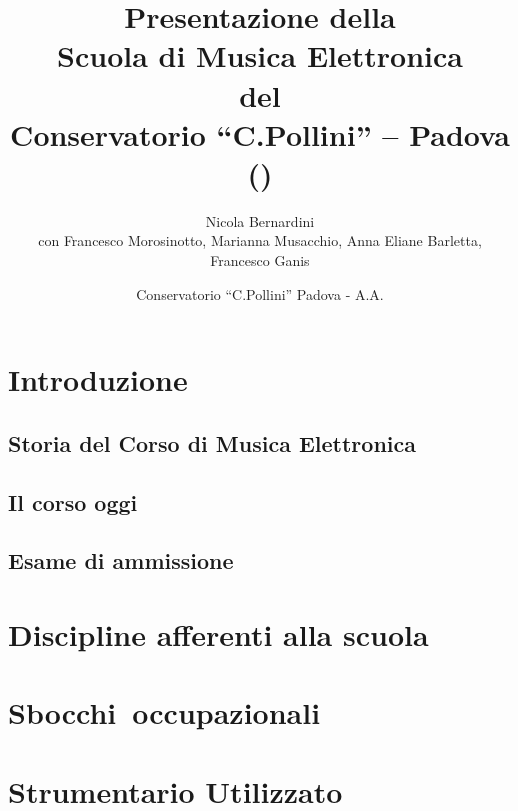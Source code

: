 \documentclass[\printmode,compress,xcolor=dvipsnames]{beamer}
\title[SME Intro \gitAbbrevHash]
{\small%
  Presentazione della\\
  Scuola di Musica Elettronica\\
  del\\
  Conservatorio ``C.Pollini'' -- Padova\\
	{\tiny (\rcstag)}
}
\author{%
  {\small Nicola Bernardini\\{\tiny con Francesco Morosinotto, Marianna
  Musacchio, Anna Eliane Barletta, Francesco Ganis}}\\
	{\tiny \href{mailto:\cpholderemail}{\cpholderemail}}
}
\date[Padova \AnnoAccademico]{Conservatorio ``C.Pollini'' Padova - A.A. \AnnoAccademico}
\begin{document}
  

\begin{frame}
	\titlepage
\end{frame}
  
\section{Introduzione}

\subsection[La\ Storia]{Storia del Corso di Musica Elettronica}

\subsection[Oggi]{Il corso oggi}

\subsection[Ammissioni]{Esame di ammissione}


\section[Discipline]{Discipline afferenti alla scuola}


\section{Sbocchi\ occupazionali}



\section[Strumentario]{Strumentario Utilizzato}

\end{document}
